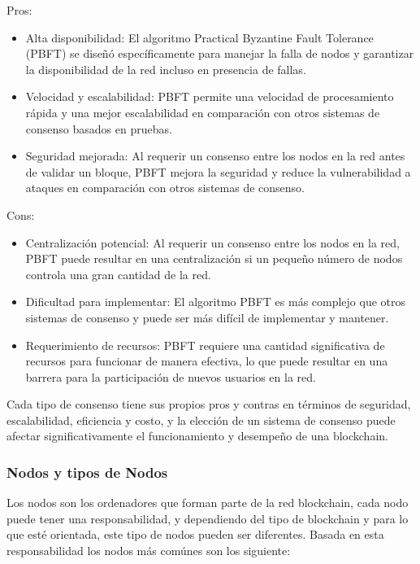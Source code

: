 \bigskip

Pros:

\begin{itemize}
    \item Alta disponibilidad: El algoritmo Practical Byzantine Fault Tolerance (PBFT) se diseñó específicamente para manejar la falla de nodos y garantizar la disponibilidad de la red incluso en presencia de fallas.
    \item Velocidad y escalabilidad: PBFT permite una velocidad de procesamiento rápida y una mejor escalabilidad en comparación con otros sistemas de consenso basados en pruebas.
    \item Seguridad mejorada: Al requerir un consenso entre los nodos en la red antes de validar un bloque, PBFT mejora la seguridad y reduce la vulnerabilidad a ataques en comparación con otros sistemas de consenso.
\end{itemize}

Cons:

\begin{itemize}
    \item Centralización potencial: Al requerir un consenso entre los nodos en la red, PBFT puede resultar en una centralización si un pequeño número de nodos controla una gran cantidad de la red.
    \item Dificultad para implementar: El algoritmo PBFT es más complejo que otros sistemas de consenso y puede ser más difícil de implementar y mantener.
    \item Requerimiento de recursos: PBFT requiere una cantidad significativa de recursos para funcionar de manera efectiva, lo que puede resultar en una barrera para la participación de nuevos usuarios en la red.
\end{itemize}

\bigskip

Cada tipo de consenso tiene sus propios pros y contras en términos de seguridad, escalabilidad, eficiencia y costo, y la elección de un sistema de consenso puede afectar significativamente el funcionamiento y desempeño de una blockchain.

\newpage

\subsubsection{Nodos y tipos de Nodos}

Los nodos\cite{nodes} son los ordenadores que forman parte de la red blockchain, cada nodo puede tener una responsabilidad, y dependiendo del tipo de blockchain y para lo que esté orientada, este tipo de nodos pueden ser diferentes. Basada en esta responsabilidad los nodos más comúnes son los siguiente:


